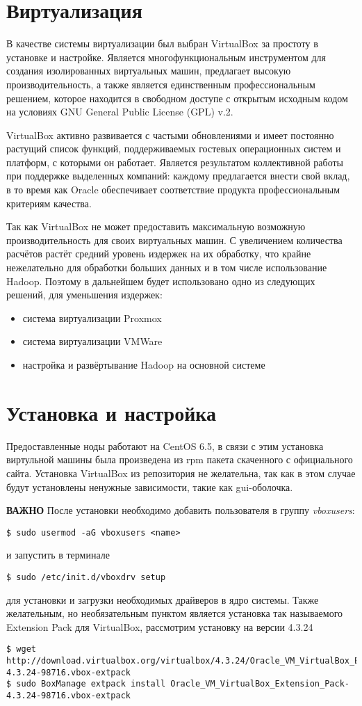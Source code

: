 \section{Виртуализация}
В качестве системы виртуализации был выбран VirtualBox за простоту в установке и настройке. Является 
многофункциональным инструментом для создания изолированных виртуальных машин, предлагает высокую 
производительность, а также является единственным профессиональным решением, которое находится в свободном 
доступе с открытым исходным кодом на условиях GNU General Public License (GPL) v.2.

VirtualBox активно развивается с частыми обновлениями и имеет постоянно растущий список функций, 
поддерживаемых гостевых операционных систем и платформ, с которыми он работает. Является результатом 
коллективной работы при поддержке выделенных компаний: каждому предлагается внести свой вклад, в то время 
как Oracle обеспечивает соответствие продукта профессиональным критериям качества. 

Так как VirtualBox не может предоставить максимальную возможную производительность для своих виртуальных 
машин. С увеличением количества расчётов растёт средний уровень издержек на их обработку, что крайне 
нежелательно для обработки больших данных и в том числе использование Hadoop. Поэтому в дальнейшем будет 
использовано одно из следующих решений, для уменьшения издержек:
\begin{itemize}
    \item система виртуализации Proxmox
    \item система виртуализации VMWare
    \item настройка и развёртывание Hadoop на основной системе
\end{itemize}

\section{Установка и настройка}
Предоставленные ноды работают на CentOS 6.5, в связи с этим установка виртульной машины была произведена из 
rpm пакета скаченного с официального сайта. Установка VirtualBox из репозитория не желательна, так как в 
этом случае будут установлены ненужные зависимости, такие как gui-оболочка.

\noindent\textbf{ВАЖНО} После установки необходимо добавить пользователя в группу \emph{vboxusers}:
\begin{lstlisting}
$ sudo usermod -aG vboxusers <name>
\end{lstlisting}
и запустить в терминале
\begin{lstlisting}
$ sudo /etc/init.d/vboxdrv setup
\end{lstlisting}
для установки и загрузки необходимых драйверов в ядро системы. Также желательным, но необязательным пунктом 
является установка так называемого Extension Pack для VirtualBox, рассмотрим установку на версии 4.3.24
\begin{lstlisting}
$ wget http://download.virtualbox.org/virtualbox/4.3.24/Oracle_VM_VirtualBox_Extension_Pack-4.3.24-98716.vbox-extpack
$ sudo BoxManage extpack install Oracle_VM_VirtualBox_Extension_Pack-4.3.24-98716.vbox-extpack
\end{lstlisting}

